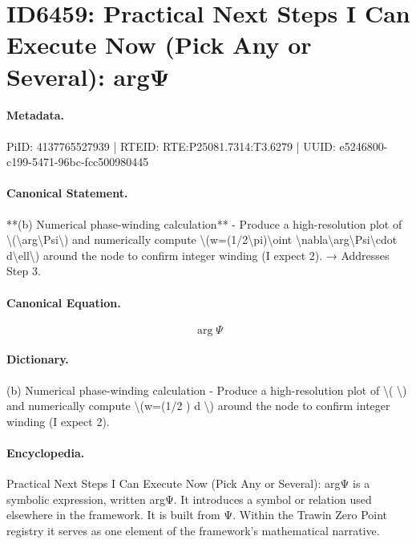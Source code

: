 \section*{ID6459: Practical Next Steps I Can Execute Now (Pick Any or Several): argΨ}
\paragraph{Metadata.}
PiID: 4137765527939 | RTEID: RTE:P25081.7314:T3.6279 | UUID: e5246800-c199-5471-96bc-fcc500980445

\paragraph{Canonical Statement.}
**(b) Numerical phase-winding calculation** - Produce a high-resolution plot of \textbackslash{}(\textbackslash{}arg\textbackslash{}Psi\textbackslash{}) and numerically compute \textbackslash{}(w=(1/2\textbackslash{}pi)\textbackslash{}oint \textbackslash{}nabla\textbackslash{}arg\textbackslash{}Psi\textbackslash{}cdot d\textbackslash{}ell\textbackslash{}) around the node to confirm integer winding (I expect 2). → Addresses Step 3.

\paragraph{Canonical Equation.}
\[
\arg\Psi
\]

\paragraph{Dictionary.}
(b) Numerical phase-winding calculation - Produce a high-resolution plot of \textbackslash{}( \textbackslash{}) and numerically compute \textbackslash{}(w=(1/2 ) d \textbackslash{}) around the node to confirm integer winding (I expect 2).

\paragraph{Encyclopedia.}
Practical Next Steps I Can Execute Now (Pick Any or Several): argΨ is a symbolic expression, written argΨ. It introduces a symbol or relation used elsewhere in the framework. It is built from Ψ. Within the Trawin Zero Point registry it serves as one element of the framework's mathematical narrative.
